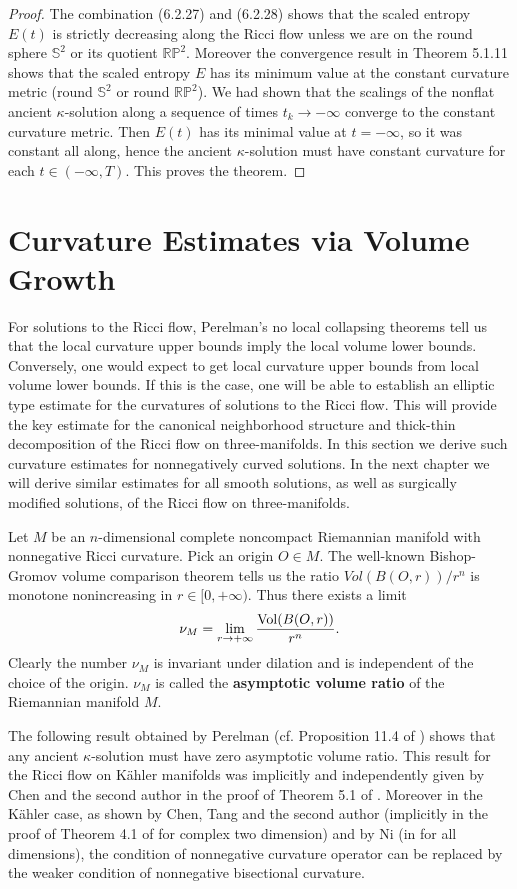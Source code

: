 \begin{proof}
The combination (6.2.27) and (6.2.28) shows that the scaled
entropy $E(t)$ is strictly decreasing along the Ricci flow unless
we are on the round sphere $\mathbb{S}^2$ or its quotient
$\mathbb{R}\mathbb{P}^2$. Moreover the convergence result in
Theorem 5.1.11 shows that the scaled entropy $E$ has its minimum
value at the constant curvature metric (round $\mathbb{S}^2$ or
round $\mathbb{R}\mathbb{P}^2$). We had shown that the scalings of
the nonflat ancient $\kappa$-solution along a sequence of times
$t_k\rightarrow-\infty$ converge to the constant curvature metric.
Then $E(t)$ has its minimal value at $t=-\infty$, so it was
constant all along, hence the ancient $\kappa$-solution must have
constant curvature for each $t\in (-\infty,T)$. This proves the
theorem.
\end{proof}


\section{Curvature Estimates via Volume Growth}

For solutions to the Ricci flow, Perelman's no local collapsing
theorems tell us that the local curvature upper bounds imply the
local volume lower bounds. Conversely, one would expect to get
local curvature upper bounds from local volume lower bounds. If
this is the case, one will be able to establish an elliptic type
estimate for the curvatures of solutions to the Ricci flow. This
will provide the key estimate for the canonical neighborhood
structure and thick-thin decomposition of the Ricci flow on
three-manifolds. In this section we derive such curvature
estimates for nonnegatively curved solutions. In the next chapter
we will derive similar estimates for all smooth solutions, as well
as surgically modified solutions, of the Ricci flow on
three-manifolds.

Let $M$ be an $n$-dimensional complete noncompact Riemannian
manifold with nonnegative Ricci curvature. Pick an origin $O\in
M$. The well-known Bishop-Gromov volume comparison theorem tells
us the ratio $Vol(B(O,r))/r^n$ is monotone nonincreasing in
$r\in[0,+\infty)$. Thus there exists a limit
$$
\nu_M=\lim_{r\rightarrow+\infty}\frac{\operatorname{Vol}(B(O,r))}{r^n}.
$$
Clearly the number $\nu_M$ is invariant under dilation and is
independent of the choice of the origin. $\nu_M$ is called the
{\bf asymptotic volume ratio} of
the Riemannian manifold $M$.

The following result obtained by Perelman (cf. Proposition 11.4 of
\cite{P1}) shows that any ancient $\kappa$-solution must have zero
asymptotic volume ratio. This result for the Ricci flow on
K\"ahler manifolds was implicitly and independently given by Chen
and the second author in the proof of Theorem 5.1 of \cite{CZ04}.
Moreover in the K\"ahler case, as shown by Chen, Tang and the
second author (implicitly in the proof of Theorem 4.1 of
\cite{CTZ04} for complex two dimension) and by Ni (in \cite{Ni}
for all dimensions), the condition of nonnegative curvature
operator can be replaced by the weaker condition of nonnegative
bisectional curvature.

